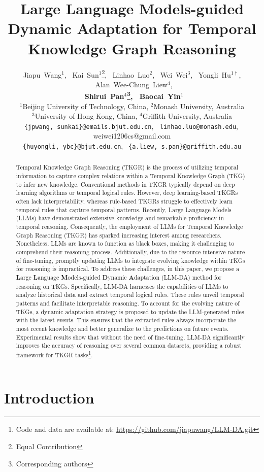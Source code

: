 \documentclass{article}
\title{Large Language Models-guided Dynamic Adaptation for Temporal Knowledge Graph Reasoning}
\author{%
  Jiapu~Wang$^{1}$, ~Kai~Sun$^{1}$\thanks{Equal Contribution}, ~Linhao~Luo$^2$, ~Wei~Wei$^3$, ~Yongli~Hu$^{1\dagger}$, ~Alan~Wee-Chung~Liew$^4$,\\ \textbf{~Shirui~Pan$^4$\thanks{Corresponding authors}, ~Baocai~Yin$^1$}
  \\
  $^1$Beijing University of Technology, China, \quad $^2$Monash University, Australia \\
  $^3$University of Hong Kong, China, \quad 
  $^4$Griffith University, Australia\\
  \texttt{\{jpwang, sunkai\}@emails.bjut.edu.cn}, $\ $ \texttt{linhao.luo@monash.edu},$\ $ weiwei1206cs@gmail.com\\
  \texttt{\{huyongli, ybc\}@bjut.edu.cn},$\ \ $ 
  \texttt{\{a.liew, s.pan\}@griffith.edu.au}
}
\begin{document}
\maketitle

\begin{abstract}
  Temporal Knowledge Graph Reasoning (TKGR) is the process of utilizing temporal information to capture complex relations within a Temporal Knowledge Graph (TKG) to infer new knowledge. 
  Conventional methods in TKGR typically depend on deep learning algorithms or temporal logical rules. However, deep learning-based TKGRs often lack interpretability, whereas rule-based TKGRs struggle to effectively learn temporal rules that capture temporal patterns. Recently, Large Language Models (LLMs) have demonstrated extensive knowledge and remarkable proficiency in temporal reasoning. Consequently, the employment of LLMs for Temporal Knowledge Graph Reasoning (TKGR) has sparked increasing interest among researchers. Nonetheless, LLMs are known to function as black boxes, making it challenging to comprehend their reasoning process.
  Additionally, due to the resource-intensive nature of fine-tuning, promptly updating LLMs to integrate evolving knowledge within TKGs for reasoning is impractical. 
  To address these challenges, in this paper, we propose a \textbf{L}arge \textbf{L}anguage \textbf{M}odels-guided \textbf{D}ynamic \textbf{A}daptation (LLM-DA) method for reasoning on TKGs.
  Specifically, LLM-DA harnesses the capabilities of LLMs to analyze historical data and extract temporal logical rules. These rules unveil temporal patterns and facilitate interpretable reasoning. To account for the evolving nature of TKGs, a dynamic adaptation strategy is proposed to update the LLM-generated rules with the latest events. This ensures that the extracted rules always incorporate the most recent knowledge and better generalize to the predictions on future events.
  Experimental results show that without the need of fine-tuning, LLM-DA significantly improves the accuracy of reasoning over several common datasets, providing a robust framework for TKGR tasks\footnote{Code and data are available at: \href{https://github.com/jiapuwang/LLM-DA.git}{https://github.com/jiapuwang/LLM-DA.git}}.
\end{abstract}

\section{Introduction}
\end{document}
